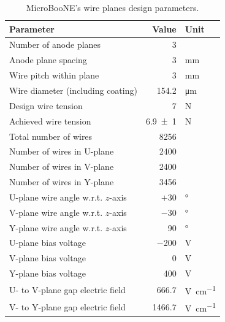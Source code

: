 \begin{table}[hbtp]
    \centering
    \caption[MicroBooNE's Wire Planes Design Parameters]{MicroBooNE's wire planes design parameters.}
    \begin{tabu} to 0.7\textwidth{lrl} \toprule
        Parameter & Value & Unit \\ \midrule
        Number of anode planes & \num{3} & \\
        Anode plane spacing & \num{3} & \si{\milli\metre} \\
        Wire pitch within plane & \num{3} & \si{\milli\metre} \\
        Wire diameter (including coating) & \num{154.2} & \si{\micro\metre} \\
        Design wire tension & \num{7} & \si{\newton} \\
        Achieved wire tension & \num{6.9(10)} & \si{\newton} \\
        Total number of wires & \num{8256} & \\
        Number of wires in U-plane & \num{2400} & \\
        Number of wires in V-plane & \num{2400} & \\
        Number of wires in Y-plane & \num{3456} & \\
        U-plane wire angle w.r.t. $z$-axis & $+\num{30}$ & \si{\degree} \\
        V-plane wire angle w.r.t. $z$-axis & \num{-30} & \si{\degree} \\
        Y-plane wire angle w.r.t. $z$-axis  & \num{90} & \si{\degree} \\
        U-plane bias voltage & \num{-200} & \si{\volt} \\
        V-plane bias voltage & \num{0} & \si{\volt} \\
        Y-plane bias voltage & \num{400} & \si{\volt} \\
        U- to V-plane gap electric field & \num{666.7} & \si{\volt\per\centi\metre} \\
        V- to Y-plane gap electric field & \num{1466.7} & \si{\volt\per\centi\metre} \\
        \bottomrule
    \end{tabu}
    \label{tab:ReadoutWireParameters}
\end{table}

